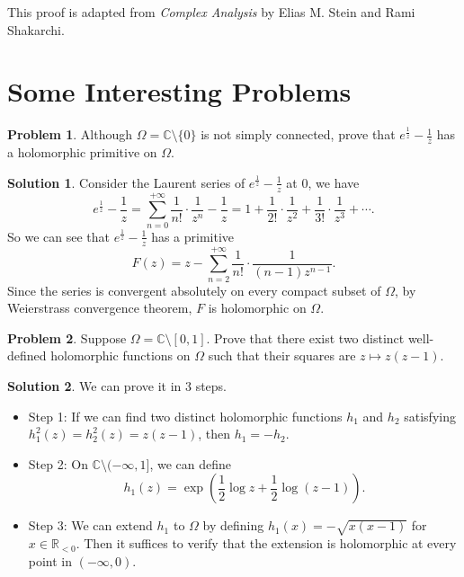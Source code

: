 \documentclass{article}
\theoremstyle{definition}
\newtheorem{problem}{Problem}
\newtheorem{solution}{Solution}
\newcommand{\R}{\mathbb{R}}
\newcommand{\C}{\mathbb{C}}
\begin{document}
This proof is adapted from \textit{Complex Analysis} by Elias M. Stein and Rami Shakarchi.


\section{Some Interesting Problems}
\begin{problem}
    Although $\Omega=\C\setminus\{0\}$ is not simply connected, prove that $e^{\frac{1}{z}}-\frac{1}{z}$ has a holomorphic primitive on $\Omega$.
\end{problem}
\begin{solution}
    Consider the Laurent series of $e^{\frac{1}{z}}-\frac{1}{z}$ at $0$, we have
    \begin{equation*}
        e^{\frac{1}{z}}-\frac{1}{z} = \sum_{n=0}^{+\infty} \frac{1}{n!} \cdot \frac{1}{z^n} - \frac{1}{z} = 1 + \frac{1}{2!}\cdot \frac{1}{z^2} + \frac{1}{3!}\cdot \frac{1}{z^3} + \cdots.
    \end{equation*}
    So we can see that $e^{\frac{1}{z}}-\frac{1}{z}$ has a primitive
    \begin{equation*}
        F(z) = z - \sum_{n=2}^{+\infty} \frac{1}{n!} \cdot \frac{1}{(n-1) z^{n-1}}.
    \end{equation*}
    Since the series is convergent absolutely on every compact subset of $\Omega$, by Weierstrass convergence theorem, $F$ is holomorphic on $\Omega$.
\end{solution}
\begin{problem}
    Suppose $\Omega=\C\setminus[0,1]$. Prove that there exist two distinct well-defined holomorphic functions on $\Omega$ such that their squares are $z\mapsto z(z-1)$.
\end{problem}
\begin{solution} We can prove it in 3 steps.
    \begin{itemize}
        \item Step 1: If we can find two distinct holomorphic functions $h_1$ and $h_2$ satisfying $h_1^2(z)=h_2^2(z)=z(z-1)$, then $h_1=-h_2$.
        \item Step 2: On $\C\setminus (-\infty,1]$, we can define 
        \begin{equation*}
            h_1(z) = \exp\left({\frac{1}{2}\log z + \frac{1}{2}\log (z-1)}\right).
        \end{equation*}
        \item Step 3: We can extend $h_1$ to $\Omega$ by defining $h_1(x)=-\sqrt{x(x-1)}$ for $x\in \R_{<0}$. Then it suffices to verify that the extension is holomorphic at every point in $(-\infty,0)$.
    \end{itemize}
\end{solution}
\end{document}
